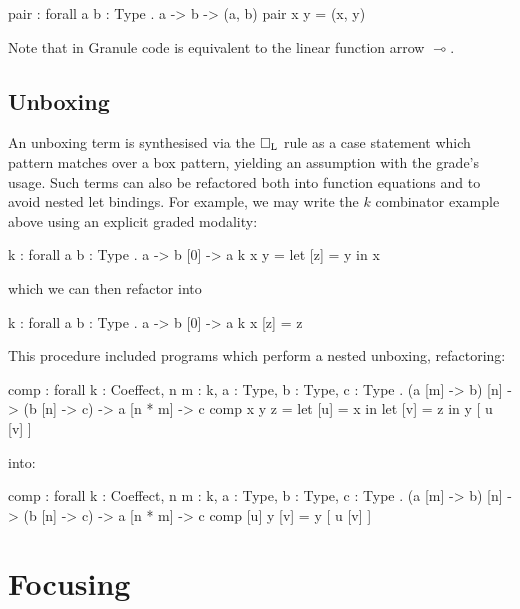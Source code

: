 \begin{granule}
pair : forall {a b : Type} . a -> b -> (a, b)
pair x y = (x, y)
\end{granule}

Note that in Granule code \granin{->} is equivalent to the linear function arrow
$\multimap$.

\subsection{Unboxing}
An unboxing term is synthesised via the $\Box_{\textsc{L}}$ rule as a case statement
which pattern matches over a box pattern, yielding an assumption with the
grade's usage. Such terms can also be refactored both into function equations
and to avoid nested let bindings. For example, we may write the $k$
combinator example above using an explicit graded modality:

\begin{granule}
k : forall {a b : Type} . a -> b [0] -> a
k x y = let [z] = y in x
\end{granule}
which we can then refactor into
\begin{granule}
k : forall {a b : Type} . a -> b [0] -> a
k x [z] = z
\end{granule}
This procedure included programs which perform a nested unboxing, refactoring:
\begin{granule}
comp : forall {k : Coeffect, n m : k, a : Type, b : Type, c : Type} .
       (a [m] -> b) [n] -> (b [n] -> c) -> a [n * m] -> c
comp x y z = let [u] = x in let [v] = z in y [ u [v] ]
\end{granule}
into:
\begin{granule}
comp : forall {k : Coeffect, n m : k, a : Type, b : Type, c : Type} .
       (a [m] -> b) [n] -> (b [n] -> c) -> a [n * m] -> c
comp [u] y [v] = y [ u [v] ]
\end{granule}

\section{Focusing}
\label{sec:linear-base-focusing}

